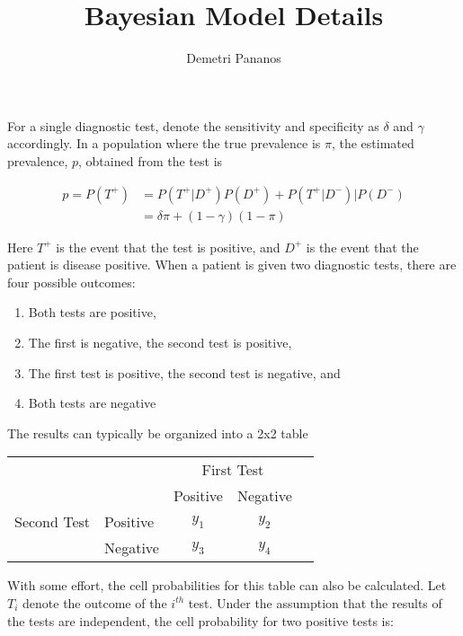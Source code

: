 \documentclass[10pt,a4paper]{article}
\author{Demetri Pananos }
\title{Bayesian Model Details}
\begin{document}
	\maketitle
	
	\noindent For a single diagnostic test, denote the sensitivity and specificity as $\delta$ and $\gamma$ accordingly. In a population where the true prevalence is $ \pi $, the estimated prevalence, $p$, obtained from the test is 
	
	\begin{align*}
	p = P(T^+) &=  P(T^{+} \vert D^+)  P(D^+) +  P(T^{+} \vert D^-) \vert P(D^-)\\
	&= \delta \pi + (1-\gamma)(1-\pi)
	\end{align*}
	
	\noindent Here $T^+$ is the event that the test is positive, and $D^+$ is the event that the patient is disease positive.   When a patient is given two diagnostic tests, there are four possible outcomes:
	\begin{enumerate}
		\item Both tests are positive,
		\item The first is negative, the second test is positive,
		\item The first test is positive, the second test is negative, and
		\item Both tests are negative
	\end{enumerate}

	\noindent The results can typically be organized into a 2x2 table

\newline
\newline

	\begin{tabular}{l|l|c|c|c}
		\multicolumn{2}{c}{}&\multicolumn{2}{c}{First Test}&\\
		
		\cline{3-4}
		\multicolumn{2}{c|}{}&Positive&Negative&\multicolumn{1}{c}{}\\
		\cline{2-4}
		\multirow{}{}{Second Test}& Positive & $y_1$ & $y_2$ \\
		\cline{2-4}
		& Negative & $y_3$ & $y_4$ &\\
		\cline{2-4}

	\end{tabular} 
\newline
\newline

	\noindent With some effort, the cell probabilities for this table can also be calculated. Let $T_{i}$ denote the outcome of the $i^{th}$ test.  Under the assumption that the results of the tests are independent, the cell probability for two positive tests is:
	
\end{document}
